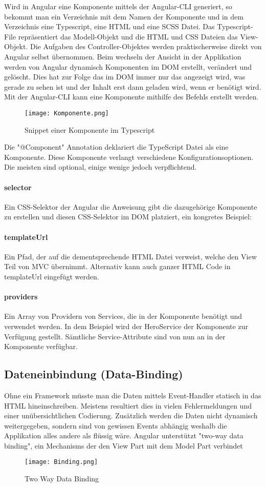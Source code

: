 Wird in Angular eine Komponente mittels der Angular-CLI generiert, so bekommt man ein Verzeichnis mit dem Namen der Komponente und in dem Verzeichnis eine Typescript, eine HTML und eine SCSS Datei. Das Typescript-File repräsentiert das Modell-Objekt und die HTML und CSS Dateien das View-Objekt. Die Aufgaben des Controller-Objektes werden praktischerweise direkt von Angular selbst übernommen. Beim wechseln der Ansicht in der Applikation werden von Angular dynamisch Komponenten im DOM erstellt, verändert und gelöscht. Dies hat zur Folge das im DOM immer nur das angezeigt wird, was gerade zu sehen ist und der Inhalt erst dann geladen wird, wenn er benötigt wird.  Mit der Angular-CLI kann eine Komponente mithilfe des Befehls  erstellt werden.
\begin{figure}[H] \centering \texttt{[image: Komponente.png]} \caption{Snippet einer Komponente im Typescript} \end{figure}
Die "@Component" Annotation deklariert die TypeScript Datei als eine Komponente. Diese Komponente verlangt verschiedene Konfigurationsoptionen. Die meisten sind optional, einige wenige jedoch verpflichtend.
\paragraph{selector}
Ein CSS-Selektor der Angular die Anweisung gibt die dazugehörige Komponente zu erstellen und diesen CSS-Selektor im DOM platziert, ein kongretes Beispiel:\\ 
\paragraph{templateUrl}
Ein Pfad, der auf die dementsprechende HTML Datei verweist, welche den View Teil von MVC übernimmt. Alternativ kann auch ganzer HTML Code in templateUrl eingefügt werden.
\paragraph{providers}
Ein Array von Providern von Services, die in der Komponente benötigt und verwendet werden. In dem Beispiel wird der HeroService der Komponente zur Verfügung gestellt. Sämtliche Service-Attribute sind von nun an in der Komponente verfügbar.\cite{Component}
\subsection{Dateneinbindung (Data-Binding)}
Ohne ein Framework müsste man die Daten mittels Event-Handler statisch in das HTML hineinschreiben. Meistens resultiert dies in vielen Fehlermeldungen und einer unübersichtlichen Codierung. Zusätzlich werden die Daten nicht dynamisch weitergegeben, sondern sind von gewissen Events abhängig weshalb die Applikation alles andere als flüssig wäre.
Angular unterstützt "two-way data binding", ein Mechanisms der den View Part mit dem Model Part verbindet
\begin{figure}[H] \centering \texttt{[image: Binding.png]} \caption{Two Way Data Binding} \end{figure}
